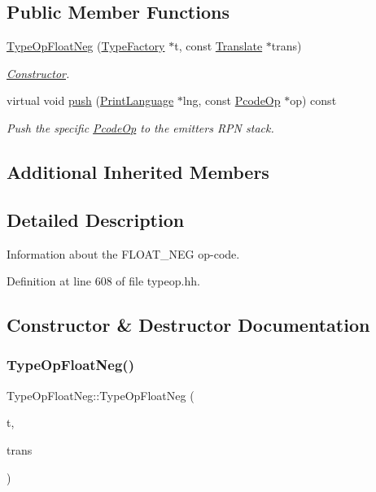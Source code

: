 \subsection*{Public Member Functions}
\begin{DoxyCompactItemize}
\item 
\mbox{\hyperlink{class_type_op_float_neg_a727e55b03cab0c90a54f7df261b97274}{Type\+Op\+Float\+Neg}} (\mbox{\hyperlink{class_type_factory}{Type\+Factory}} $\ast$t, const \mbox{\hyperlink{class_translate}{Translate}} $\ast$trans)
\begin{DoxyCompactList}\small\item\em \mbox{\hyperlink{class_constructor}{Constructor}}. \end{DoxyCompactList}\item 
virtual void \mbox{\hyperlink{class_type_op_float_neg_a5a17bc9f76459084cffbb4ba1de799d0}{push}} (\mbox{\hyperlink{class_print_language}{Print\+Language}} $\ast$lng, const \mbox{\hyperlink{class_pcode_op}{Pcode\+Op}} $\ast$op) const
\begin{DoxyCompactList}\small\item\em Push the specific \mbox{\hyperlink{class_pcode_op}{Pcode\+Op}} to the emitter\textquotesingle{}s R\+PN stack. \end{DoxyCompactList}\end{DoxyCompactItemize}
\subsection*{Additional Inherited Members}


\subsection{Detailed Description}
Information about the F\+L\+O\+A\+T\+\_\+\+N\+EG op-\/code. 

Definition at line 608 of file typeop.\+hh.



\subsection{Constructor \& Destructor Documentation}
\mbox{\label{class_type_op_float_neg_a727e55b03cab0c90a54f7df261b97274}} 
\subsubsection{\texorpdfstring{TypeOpFloatNeg()}{TypeOpFloatNeg()}}
{\footnotesize\ttfamily Type\+Op\+Float\+Neg\+::\+Type\+Op\+Float\+Neg (\begin{DoxyParamCaption}\item[{\mbox{\hyperlink{class_type_factory}{Type\+Factory}} $\ast$}]{t,  }\item[{const \mbox{\hyperlink{class_translate}{Translate}} $\ast$}]{trans }\end{DoxyParamCaption})}



